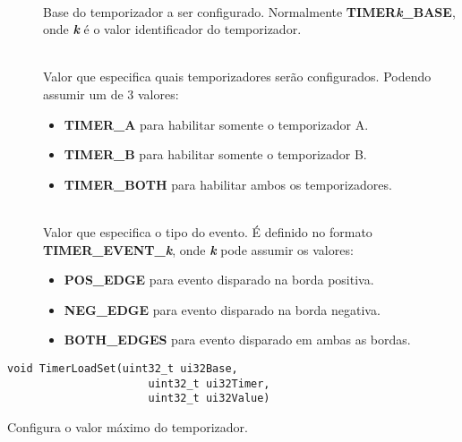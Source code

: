 \begin{description}
	\item []\hfill \\
	Base do temporizador a ser configurado. Normalmente \textbf{TIMER\emph{k}\_BASE}, onde \textbf{\emph{k}} é o valor identificador do temporizador.
	
	\item []\hfill \\
	Valor que especifica quais temporizadores serão configurados. Podendo assumir um de 3 valores:
	\begin{itemize}
		\item \textbf{TIMER\_A} para habilitar somente o temporizador A.
		\item \textbf{TIMER\_B} para habilitar somente o temporizador B.
		\item \textbf{TIMER\_BOTH} para habilitar ambos os temporizadores.
	\end{itemize}
	
	\item []\hfill \\
	Valor que especifica o tipo do evento. É definido no formato \textbf{TIMER\_EVENT\_\emph{k}}, onde \textbf{\emph{k}} pode assumir os valores:
	\begin{itemize}
		\item \textbf{POS\_EDGE} para evento disparado na borda positiva.
		\item \textbf{NEG\_EDGE} para evento disparado na borda negativa.
		\item \textbf{BOTH\_EDGES} para evento disparado em ambas as bordas.
	\end{itemize}
\end{description}

\begin{lstlisting}[style=funcao]
	void TimerLoadSet(uint32_t ui32Base,
					  uint32_t ui32Timer,
					  uint32_t ui32Value)
\end{lstlisting}

Configura o valor máximo do temporizador.

